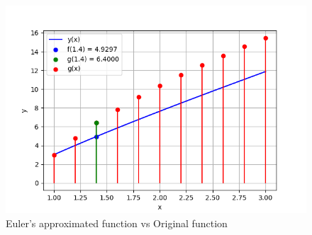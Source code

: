\documentclass[journal,12pt,onecolumn]{IEEEtran}
\theoremstyle{remark}
\begin{document}
    \begin{figure}[!ht]    
    \centering
\graphicspath{ {figs/} }
\includegraphics[width=\columnwidth]{graph_1}
\caption{ Euler's approximated function vs Original function  }
\label{graph:ee25-gate2-graph}
\end{figure}
\end{document}
